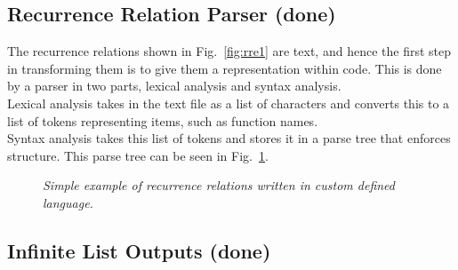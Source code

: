 \documentclass{article}
\begin{document}
\subsection{Recurrence Relation Parser (done)}  




The recurrence relations shown in Fig.~\ref{fig:rre1} are text, and hence the first step in transforming them is to give them a representation within code. This is done by a parser in two parts, lexical analysis and syntax analysis.\\
Lexical analysis takes in the text file as a list of characters and converts this to a list of tokens representing items, such as function names.\\
Syntax analysis takes this list of tokens and stores it in a parse tree that enforces structure. This parse tree can be seen in Fig.~\ref{fig:parsetree}.  
 
\begin{figure}[H]
	\centering
	
	\caption{\it Simple example of recurrence relations written in custom defined language.}
	\label{fig:parsetree}
\end{figure} 


\subsection{Infinite List Outputs (done)}


\end{document}
